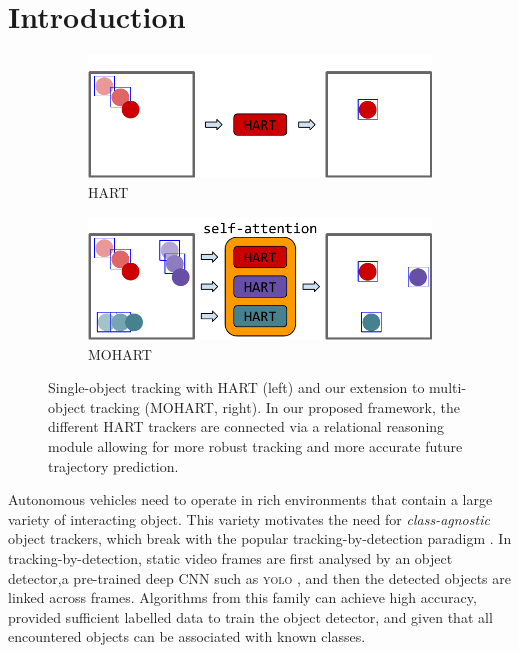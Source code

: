 \section{Introduction}
\label{sec:mohart_intro}


\begin{figure}[b!]
    \centering
    \begin{subfigure}[c]{0.41\linewidth}
        \centering
        \includegraphics[width=\linewidth]{figures/MOHART/system_hart}
        \caption{HART}
    \end{subfigure}
    \hspace{20mm}
    \begin{subfigure}[c]{0.41\linewidth}
        \centering
        \includegraphics[width=\linewidth]{figures/MOHART/system_mohart}
        \caption{MOHART}
    \end{subfigure}
    \caption{
    Single-object tracking with \gls{HART} (left) and our extension to multi-object tracking (\gls{MOHART}, right). In our proposed framework, the different \gls{HART} trackers are connected via a relational reasoning module allowing for more robust tracking and more accurate future trajectory prediction.
    }
    \label{fig:teaser}
\end{figure}

Autonomous vehicles need to operate in rich environments that contain a large variety of interacting object. 
This variety motivates the need for \emph{class-agnostic} object trackers, which break with the popular tracking-by-detection paradigm \cite{Zhang2008,Milan2014,Bae2017confidence, Keuper2018motion}. 
In tracking-by-detection, static video frames are first analysed by an object detector,\eg a pre-trained deep \gls{CNN} such as \textsc{yolo} \citep{Redmon15}, and then the detected objects are linked across frames. 
Algorithms from this family can achieve high accuracy, provided sufficient labelled data to train the object detector, and given that all encountered objects can be associated with known classes. 

